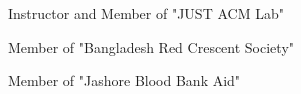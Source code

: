 \begin{zitemize}
\item Instructor and Member of "JUST ACM Lab"
\item Member of "Bangladesh Red Crescent Society"
\item Member of "Jashore Blood Bank Aid"
\end{zitemize}